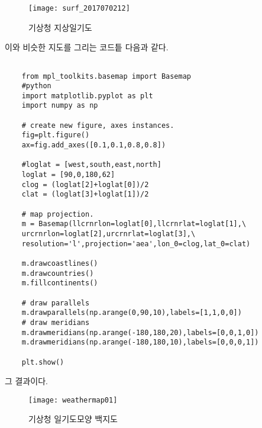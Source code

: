 \begin{figure}[h]
	\centering
	\texttt{[image: surf\_2017070212]}
	\caption{기상청 지상일기도}
	\label{fig:surf2017070212}
\end{figure}

이와 비슷한 지도를 그리는 코드틑 다음과 같다.

\begin{code}
	\begin{lstlisting}
	
	from mpl_toolkits.basemap import Basemap
	#python 
	import matplotlib.pyplot as plt
	import numpy as np
	
	# create new figure, axes instances.
	fig=plt.figure()
	ax=fig.add_axes([0.1,0.1,0.8,0.8])
	
	#loglat = [west,south,east,north]
	loglat = [90,0,180,62]
	clog = (loglat[2]+loglat[0])/2
	clat = (loglat[3]+loglat[1])/2
	
	# map projection.
	m = Basemap(llcrnrlon=loglat[0],llcrnrlat=loglat[1],\
	urcrnrlon=loglat[2],urcrnrlat=loglat[3],\
	resolution='l',projection='aea',lon_0=clog,lat_0=clat)
	
	m.drawcoastlines()
	m.drawcountries()
	m.fillcontinents()
	
	# draw parallels
	m.drawparallels(np.arange(0,90,10),labels=[1,1,0,0])
	# draw meridians
	m.drawmeridians(np.arange(-180,180,20),labels=[0,0,1,0])
	m.drawmeridians(np.arange(-180,180,10),labels=[0,0,0,1])
	
	plt.show()	
	\end{lstlisting}
\end{code}

그 결과이다. 

\begin{figure}[h]
	\centering
	\texttt{[image: weathermap01]}
	\caption{기상청 일기도모양 백지도}
	\label{fig:weathermap01}
\end{figure}